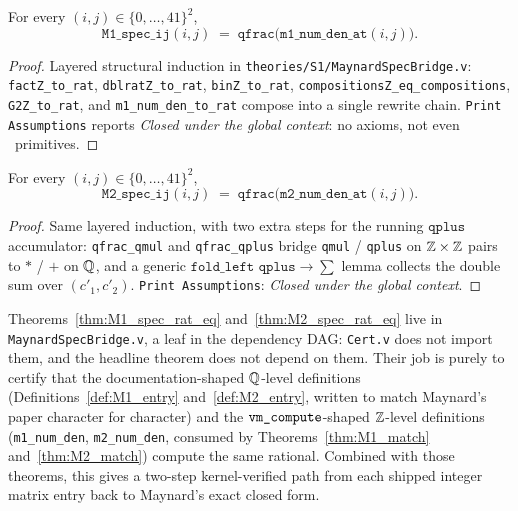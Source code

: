 \begin{theorem}\label{thm:M1_spec_rat_eq}
\rocqok
{}
For every $(i, j) \in \{0, \ldots, 41\}^2$,
\[
  \texttt{M1\_spec\_ij}(i, j) \;=\; \texttt{qfrac}\bigl(\texttt{m1\_num\_den\_at}(i, j)\bigr).
\]
\end{theorem}
\begin{proof}\rocqok
Layered structural induction in
\texttt{theories/S1/MaynardSpecBridge.v}: \texttt{factZ\_to\_rat},
\texttt{dblratZ\_to\_rat}, \texttt{binZ\_to\_rat},
\texttt{compositionsZ\_eq\_compositions}, \texttt{G2Z\_to\_rat}, and
\texttt{m1\_num\_den\_to\_rat} compose into a single rewrite chain.
\texttt{Print Assumptions} reports \emph{Closed under the global
context}: no axioms, not even \Uintsf\ primitives.
\end{proof}

\begin{theorem}\label{thm:M2_spec_rat_eq}
\rocqok
{}
For every $(i, j) \in \{0, \ldots, 41\}^2$,
\[
  \texttt{M2\_spec\_ij}(i, j) \;=\; \texttt{qfrac}\bigl(\texttt{m2\_num\_den\_at}(i, j)\bigr).
\]
\end{theorem}
\begin{proof}\rocqok
Same layered induction, with two extra steps for the running
$\texttt{qplus}$ accumulator: \texttt{qfrac\_qmul} and
\texttt{qfrac\_qplus} bridge \texttt{qmul} / \texttt{qplus} on
$\mathbb{Z} \times \mathbb{Z}$ pairs to $*$ / $+$ on $\mathbb{Q}$, and a generic
$\texttt{fold\_left qplus} \to \sum$ lemma collects the double sum
over $(c'_1, c'_2)$. \texttt{Print Assumptions}: \emph{Closed under
the global context}.
\end{proof}

\begin{remark}
Theorems~\ref{thm:M1_spec_rat_eq} and~\ref{thm:M2_spec_rat_eq} live
in \texttt{MaynardSpecBridge.v}, a leaf in the dependency DAG:
\texttt{Cert.v} does not import them, and the headline theorem does
not depend on them. Their job is purely to certify that the
documentation-shaped $\mathbb{Q}$-level definitions
(Definitions~\ref{def:M1_entry} and~\ref{def:M2_entry}, written to
match Maynard's paper character for character) and the
$\texttt{vm\_compute}$-shaped $\mathbb{Z}$-level definitions
(\texttt{m1\_num\_den}, \texttt{m2\_num\_den}, consumed by
Theorems~\ref{thm:M1_match} and~\ref{thm:M2_match}) compute the same
rational. Combined with those theorems, this gives a two-step
kernel-verified path from each shipped integer matrix entry back to
Maynard's exact closed form.
\end{remark}

